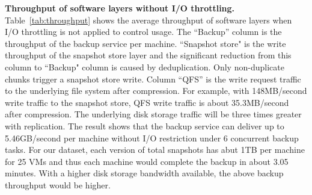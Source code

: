 {\bf Throughput of software layers without I/O throttling.}
Table~\ref{tab:throughput} shows the  average throughput of software layers
when I/O throttling is not applied to control usage. The
``Backup'' column is the throughput  of the backup service  per machine.
``Snapshot store" is the  write throughput of the snapshot store layer and the significant reduction from this
column to  ``Backup" column is caused by deduplication.
Only non-duplicate chunks trigger a snapshot store write.
Column ``QFS'' is the write request traffic to the underlying file system after compression.
For example, with 148MB/second write traffic to the snapshot store, QFS write traffic is about 35.3MB/second
after compression.  The underlying disk storage traffic will be three times greater with replication.
The result shows that the backup service can deliver up to 5.46GB/second 
per machine without I/O restriction
under 6 concurrent backup tasks. 
For our dataset, each version of total snapshots  has abut  1TB per machine for 25 VMs and  thus  each machine
would complete the backup in about 3.05 minutes.
With a higher disk storage bandwidth available, the above backup
throughput would be higher. 
 



